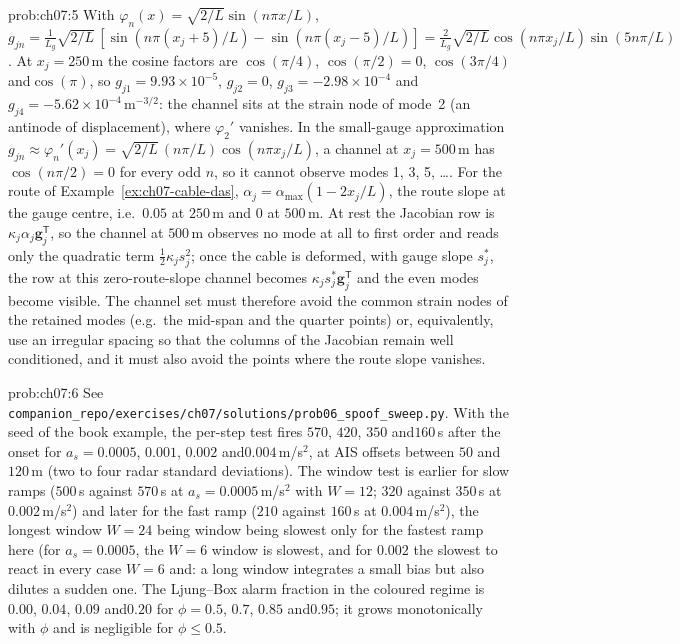 \documentclass[graybox,envcountchap]{style/SNmono}
\newcommand{\repopath}[1]{\texttt{#1}}
\providecommand{\DIFadd}[1]{{\protect\color{blue} #1}} %
\providecommand{\DIFdel}[1]{{\protect\color{red} #1}} %
\providecommand{\DIFaddbegin}{} %
\providecommand{\DIFaddend}{} %
\providecommand{\DIFdelbegin}{} %
\providecommand{\DIFdelend}{} %
\begin{document}
\begin{sol}{prob:ch07:5}
With $\varphi_n(x)=\sqrt{2/L}\sin(n\pi x/L)$, $g_{jn}=\frac{1}{L_g}\sqrt{2/L}\,[\sin(n\pi(x_j+5)/L)-\sin(n\pi(x_j-5)/L)]=\frac{2}{L_g}\sqrt{2/L}\cos(n\pi x_j/L)\sin(5n\pi/L)$. At $x_j=250$\,m the cosine factors are $\cos(\pi/4)$, $\cos(\pi/2)=0$, $\cos(3\pi/4)$ and\DIFaddbegin \allowbreak \DIFaddend $\cos(\pi)$, so $g_{j1}=9.93\times10^{-5}$, $g_{j2}=0$, $g_{j3}=-2.98\times10^{-4}$ and\DIFaddbegin \allowbreak \DIFaddend $g_{j4}=-5.62\times10^{-4}$\,m$^{-3/2}$: the channel sits at the strain node of mode~2 (an antinode of displacement), where $\varphi_2'$ vanishes. In the small-gauge approximation $g_{jn}\approx\varphi_n'(x_j)=\sqrt{2/L}\,(n\pi/L)\cos(n\pi x_j/L)$, a channel at $x_j=500$\,m has $\cos(n\pi/2)=0$ for every odd $n$, so it cannot observe modes 1, 3, 5, \ldots. For the route of Example~\ref{ex:ch07-cable-das}, $\alpha_j=\alpha_{\max}(1-2x_j/L)$, the route slope at the gauge centre, i.e.\ $0.05$ at $250$\,m and $0$ at $500$\,m. At rest the Jacobian row is $\kappa_j\alpha_j\mathbf{g}_j^{\mathsf T}$, so the channel at $500$\,m observes no mode at all to first order and reads only the quadratic term $\tfrac12\kappa_js_j^{2}$; once the cable is deformed, with gauge slope $s_j^{\ast}$, the row \DIFaddbegin \DIFadd{at this zero-route-slope channel }\DIFaddend becomes $\kappa_js_j^{\ast}\mathbf{g}_j^{\mathsf T}$ and the even modes become visible. The channel set must therefore avoid the common strain nodes of the retained modes (e.g.\ the mid-span and the quarter points) or, equivalently, use an irregular spacing so that the columns of the Jacobian remain well conditioned, and it must also avoid the points where the route slope vanishes.
\end{sol}
\begin{sol}{prob:ch07:6}
See \repopath{companion\_\allowbreak repo/\allowbreak exercises/\allowbreak ch07/\allowbreak solutions/\allowbreak prob06\_\allowbreak spoof\_\allowbreak sweep.py}. With the seed of the book example, the per-step test fires $570$, $420$, $350$ and\DIFaddbegin \allowbreak \DIFaddend $160$\,s after the onset for $a_s=0.0005$, $0.001$, $0.002$ and\DIFaddbegin \allowbreak \DIFaddend $0.004$\,m/s$^{2}$, at AIS offsets between $50$ and\DIFaddbegin \allowbreak \DIFaddend $120$\,m (two to four radar standard deviations). The window test is earlier for slow ramps ($500$\,s against $570$\,s at $a_s=0.0005$\,m/s$^{2}$ with $W=12$; $320$ against $350$\,s at $0.002$\,m/s$^{2}$) and later for the fast ramp ($210$ against $160$\,s at $0.004$\,m/s$^{2}$), the \DIFdelbegin \DIFdel{longest window }\DIFdelend $W=24$ \DIFdelbegin \DIFdel{being }\DIFdelend \DIFaddbegin \DIFadd{window being slowest only for the fastest ramp here (for $a_s=0.0005$, the $W=6$ window is slowest, and for $0.002$ }\DIFaddend the \DIFdelbegin \DIFdel{slowest to react in every case}\DIFdelend \DIFaddbegin \DIFadd{$W=6$ and}\allowbreak \DIFadd{$24$ windows tie)}\DIFaddend : a long window integrates a small bias but also dilutes a sudden one. The Ljung--Box alarm fraction in the coloured regime is $0.00$, $0.04$, $0.09$ and\DIFaddbegin \allowbreak \DIFaddend $0.20$ for $\phi=0.5$, $0.7$, $0.85$ and\DIFaddbegin \allowbreak \DIFaddend $0.95$; it grows monotonically with $\phi$ and is negligible for $\phi\le0.5$.
\end{sol}
\end{document}
